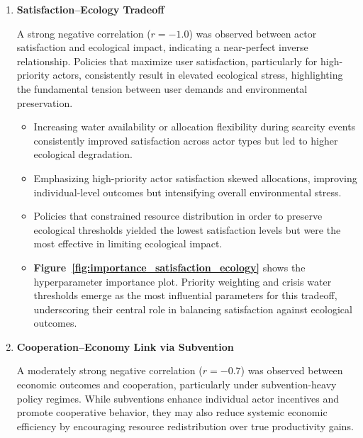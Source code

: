 \documentclass[ruler]{CUP-JNL-EDS}%
\begin{document}
\begin{enumerate}

    \item \textbf{Satisfaction--Ecology Tradeoff}  
    
    A strong negative correlation ($r = -1.0$) was observed between actor satisfaction and ecological impact, indicating a near-perfect inverse relationship. Policies that maximize user satisfaction, particularly for high-priority actors, consistently result in elevated ecological stress, highlighting the fundamental tension between user demands and environmental preservation.

    \begin{itemize}
        \item Increasing water availability or allocation flexibility during scarcity events consistently improved satisfaction across actor types but led to higher ecological degradation.
        \item Emphasizing high-priority actor satisfaction skewed allocations, improving individual-level outcomes but intensifying overall environmental stress.
        \item Policies that constrained resource distribution in order to preserve ecological thresholds yielded the lowest satisfaction levels but were the most effective in limiting ecological impact.
        \item \textbf{Figure~\ref{fig:importance_satisfaction_ecology}} shows the hyperparameter importance plot. Priority weighting and crisis water thresholds emerge as the most influential parameters for this tradeoff, underscoring their central role in balancing satisfaction against ecological outcomes.
    \end{itemize}

    \item \textbf{Cooperation--Economy Link via Subvention}

    A moderately strong negative correlation ($r = -0.7$) was observed between economic outcomes and cooperation, particularly under subvention-heavy policy regimes. While subventions enhance individual actor incentives and promote cooperative behavior, they may also reduce systemic economic efficiency by encouraging resource redistribution over true productivity gains.


\end{enumerate}
\end{document}
